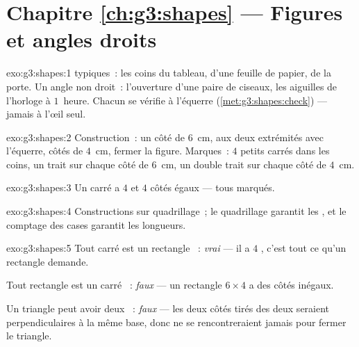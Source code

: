 \section*{Chapitre \ref{ch:g3:shapes} --- Figures et angles droits}

\begin{solution}{exo:g3:shapes:1}
 typiques~: les coins du tableau, d'une feuille de
papier, de la porte. Un angle non droit~: l'ouverture d'une paire de
ciseaux, les aiguilles de l'horloge à $1$~heure. Chacun se
vérifie à l'équerre (\cref{met:g3:shapes:check}) --- jamais
à l'œil seul.
\end{solution}

\begin{solution}{exo:g3:shapes:2}
Construction~: un côté de $6$~cm,  aux deux
extrémités avec l'équerre, côtés de $4$~cm, fermer la
figure. Marques~: $4$ petits carrés dans les coins, un trait sur
chaque côté de $6$~cm, un double trait sur chaque côté de
$4$~cm.
\end{solution}

\begin{solution}{exo:g3:shapes:3}
Un carré a $4$  et $4$ côtés égaux --- tous
marqués.
\end{solution}

\begin{solution}{exo:g3:shapes:4}
Constructions sur quadrillage~; le quadrillage garantit les , et le comptage des cases garantit les longueurs.
\end{solution}

\begin{solution}{exo:g3:shapes:5}
\guillemotleft{} Tout carré est un rectangle \guillemotright{}~:
\emph{vrai} --- il a $4$ , c'est tout ce qu'un
rectangle demande.

\guillemotleft{} Tout rectangle est un carré \guillemotright{}~:
\emph{faux} --- un rectangle $6 \times 4$ a des côtés inégaux.

\guillemotleft{} Un triangle peut avoir deux 
\guillemotright{}~: \emph{faux} --- les deux côtés tirés des
deux  seraient perpendiculaires à la même base,
donc ne se rencontreraient jamais pour fermer le triangle.
\end{solution}

